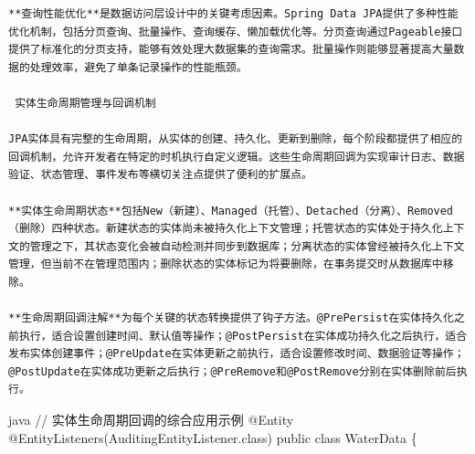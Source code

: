 \begin{lstlisting}
**查询性能优化**是数据访问层设计中的关键考虑因素。Spring Data JPA提供了多种性能优化机制，包括分页查询、批量操作、查询缓存、懒加载优化等。分页查询通过Pageable接口提供了标准化的分页支持，能够有效处理大数据集的查询需求。批量操作则能够显著提高大量数据的处理效率，避免了单条记录操作的性能瓶颈。

 实体生命周期管理与回调机制

JPA实体具有完整的生命周期，从实体的创建、持久化、更新到删除，每个阶段都提供了相应的回调机制，允许开发者在特定的时机执行自定义逻辑。这些生命周期回调为实现审计日志、数据验证、状态管理、事件发布等横切关注点提供了便利的扩展点。

**实体生命周期状态**包括New（新建）、Managed（托管）、Detached（分离）、Removed（删除）四种状态。新建状态的实体尚未被持久化上下文管理；托管状态的实体处于持久化上下文的管理之下，其状态变化会被自动检测并同步到数据库；分离状态的实体曾经被持久化上下文管理，但当前不在管理范围内；删除状态的实体标记为将要删除，在事务提交时从数据库中移除。

**生命周期回调注解**为每个关键的状态转换提供了钩子方法。@PrePersist在实体持久化之前执行，适合设置创建时间、默认值等操作；@PostPersist在实体成功持久化之后执行，适合发布实体创建事件；@PreUpdate在实体更新之前执行，适合设置修改时间、数据验证等操作；@PostUpdate在实体成功更新之后执行；@PreRemove和@PostRemove分别在实体删除前后执行。
\end{lstlisting}

java // 实体生命周期回调的综合应用示例 @Entity @EntityListeners(AuditingEntityListener.class) public class WaterData \{

